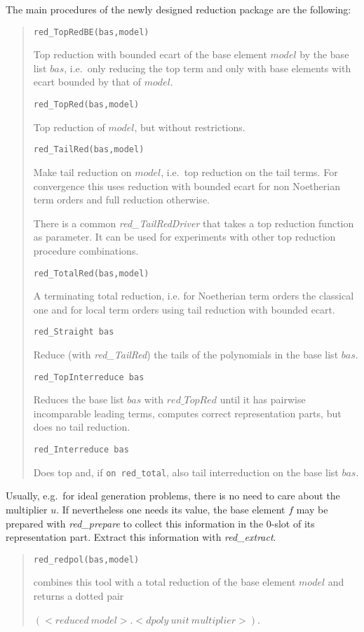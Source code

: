 \documentclass[a4paper,11pt]{article}
\newcommand{\ind}[1]{{\em #1}\index{#1}}
\newcommand{\pbx}[1]{\mbox{}\hfill \parbox[t]{12cm}{#1} \pagebreak[3]}
\begin{document}
The main procedures of the newly designed reduction package are the
following: 
\begin{quote}
\verb|red_TopRedBE(bas,model)|

\pbx{Top reduction with bounded ecart of the base element $model$ by
the base list $bas$, i.e.\ only reducing the top term and only with
base elements with ecart bounded by that of $model$.} 

\verb|red_TopRed(bas,model)|

\pbx{Top reduction of $model$, but without restrictions.}

\verb|red_TailRed(bas,model)|

\pbx{Make tail reduction on $model$, i.e.\ top reduction on the tail
terms. For convergence this uses reduction with bounded ecart for non
Noetherian term orders and full reduction otherwise.}
\medskip

There is a common \ind{red\_TailRedDriver} that takes a top reduction
function as parameter. It can be used for experiments with other top
reduction procedure combinations.

\verb|red_TotalRed(bas,model)|

\pbx{A terminating total reduction, i.e. for Noetherian term orders
the classical one and for local term orders using tail reduction with 
bounded ecart.} 

\verb|red_Straight bas|

\pbx{Reduce (with {\em red\_TailRed}) the tails of the polynomials in
the base list $bas$.}   

\verb|red_TopInterreduce bas|

\pbx{Reduces the base list $bas$ with $red\_TopRed$ until it
has pairwise incomparable leading terms, computes correct
representation parts, but does no tail reduction.}  

\verb|red_Interreduce bas|

\pbx{Does top and, if {\tt on red\_total}, also tail interreduction on
the base list $bas$.}  
\end{quote}

Usually, e.g.\ for ideal generation problems, there is no need to care
about the multiplier $u$. If nevertheless one needs its value, the
base element $f$ may be prepared with \ind{red\_prepare} to collect
this information in the 0-slot of its representation part. Extract
this information with \ind{red\_extract}.
\begin{quote}
\verb|red_redpol(bas,model)|

\pbx{combines this tool with a total reduction of the base element
$model$ and returns a dotted pair 

\centerline{$(<reduced\ model> . <dpoly\ unit\ multiplier>)$.}}   
\end{quote}
\end{document}
